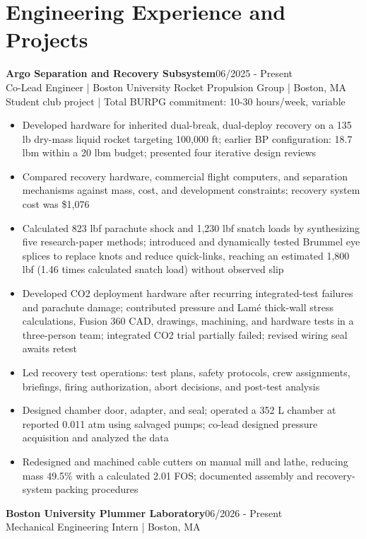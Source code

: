 \documentclass[letterpaper,10pt]{article}
\begin{document}
\section*{Engineering Experience and Projects}
\textbf{Argo Separation and Recovery Subsystem}\hfill 06/2025 - Present\\
Co-Lead Engineer | Boston University Rocket Propulsion Group | Boston, MA\\
Student club project | Total BURPG commitment: 10-30 hours/week, variable
\begin{itemize}[leftmargin=12pt,itemsep=2pt,topsep=2pt,parsep=0pt]
\item Developed hardware for inherited dual-break, dual-deploy recovery on a 135 lb dry-mass liquid rocket targeting 100,000 ft; earlier BP configuration: 18.7 lbm within a 20 lbm budget; presented four iterative design reviews
\item Compared recovery hardware, commercial flight computers, and separation mechanisms against mass, cost, and development constraints; recovery system cost was \$1,076
\item Calculated 823 lbf parachute shock and 1,230 lbf snatch loads by synthesizing five research-paper methods; introduced and dynamically tested Brummel eye splices to replace knots and reduce quick-links, reaching an estimated 1,800 lbf (1.46 times calculated snatch load) without observed slip
\item Developed CO2 deployment hardware after recurring integrated-test failures and parachute damage; contributed pressure and Lamé thick-wall stress calculations, Fusion 360 CAD, drawings, machining, and hardware tests in a three-person team; integrated CO2 trial partially failed; revised wiring seal awaits retest
\item Led recovery test operations: test plans, safety protocols, crew assignments, briefings, firing authorization, abort decisions, and post-test analysis
\item Designed chamber door, adapter, and seal; operated a 352 L chamber at reported 0.011 atm using salvaged pumps; co-lead designed pressure acquisition and analyzed the data
\item Redesigned and machined cable cutters on manual mill and lathe, reducing mass 49.5\% with a calculated 2.01 FOS; documented assembly and recovery-system packing procedures
\end{itemize}
\textbf{Boston University Plummer Laboratory}\hfill 06/2026 - Present\\
Mechanical Engineering Intern | Boston, MA\\
\end{document}
